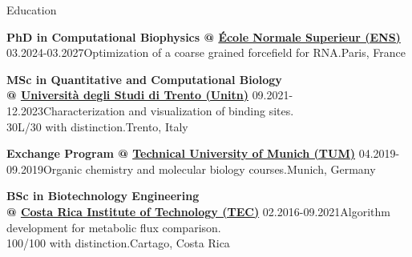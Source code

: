 \begin{rSection}{Education}
    \vspace{\baselineskip}

    \begin{rSubsectionShort}{
        \bf PhD in Computational Biophysics @ \href{https://www.lpens.ens.psl.eu/}{École Normale Superieur (ENS)}
    }{03.2024-03.2027}{Optimization of a coarse grained forcefield for RNA.}{Paris, France}
    \end{rSubsectionShort}

    \begin{rSubsectionShort}{
        \bf MSc in Quantitative and Computational Biology \\@ \href{https://www.unitn.it/}{Università degli Studi di Trento (Unitn)}
    }{09.2021-12.2023}{Characterization and visualization of binding sites. \\30L/30 with distinction.}{Trento, Italy}
    \end{rSubsectionShort}

    \begin{rSubsectionShort}{
        \bf Exchange Program @ \href{https://www.tum.de/en/}{Technical University of Munich (TUM)}
    }{04.2019-09.2019}{Organic chemistry and molecular biology courses.}{Munich, Germany}
    \end{rSubsectionShort}

    \begin{rSubsectionShort}{
        \bf BSc in Biotechnology Engineering \\@ \href{https://www.tec.ac.cr/}{Costa Rica Institute of Technology (TEC)}
    }{02.2016-09.2021}{Algorithm development for metabolic flux comparison. \\100/100 with distinction.}{Cartago, Costa Rica}
    \end{rSubsectionShort}

\end{rSection}



